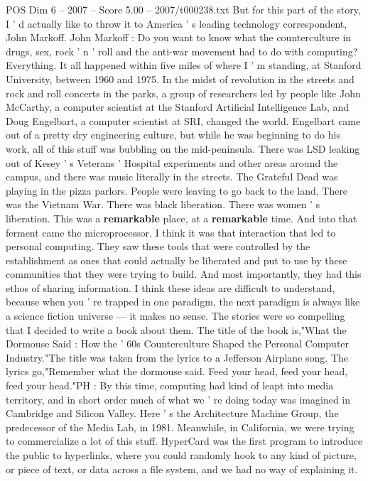 \begin{textsample}{POS Dim 6 – 2007 – Score 5.00 – 2007/t000238.txt}
But for this part of the story, I ' d actually like to throw it to America ' s leading technology correspondent, John Markoff.
John Markoff : Do you want to know what the counterculture in drugs, sex, rock ' n ' roll and the anti-war movement had to do with computing?
Everything.
It all happened within five miles of where I ' m standing, at Stanford University, between 1960 and 1975.
In the midst of revolution in the streets and rock and roll concerts in the parks, a group of researchers led by people like John McCarthy, a computer scientist at the Stanford Artificial Intelligence Lab, and Doug Engelbart, a computer scientist at SRI, changed the world.
Engelbart came out of a pretty dry engineering culture, but while he was beginning to do his work, all of this stuff was bubbling on the mid-peninsula.
There was LSD leaking out of Kesey ' s Veterans ' Hospital experiments and other areas around the campus, and there was music literally in the streets.
The Grateful Dead was playing in the pizza parlors.
People were leaving to go back to the land.
There was the Vietnam War.
There was black liberation.
There was women ' s liberation.
This was a \textbf{remarkable} place, at a \textbf{remarkable} time.
And into that ferment came the microprocessor.
I think it was that interaction that led to personal computing.
They saw these tools that were controlled by the establishment as ones that could actually be liberated and put to use by these communities that they were trying to build.
And most importantly, they had this ethos of sharing information.
I think these ideas are difficult to understand, because when you ' re trapped in one paradigm, the next paradigm is always like a science fiction universe — it makes no sense.
The stories were so compelling that I decided to write a book about them.
The title of the book is,"What the Dormouse Said : How the ' 60s Counterculture Shaped the Personal Computer Industry."The title was taken from the lyrics to a Jefferson Airplane song.
The lyrics go,"Remember what the dormouse said.
Feed your head, feed your head, feed your head."PH : By this time, computing had kind of leapt into media territory, and in short order much of what we ' re doing today was imagined in Cambridge and Silicon Valley.
Here ' s the Architecture Machine Group, the predecessor of the Media Lab, in 1981.
Meanwhile, in California, we were trying to commercialize a lot of this stuff.
HyperCard was the first program to introduce the public to hyperlinks, where you could randomly hook to any kind of picture, or piece of text, or data across a file system, and we had no way of explaining it.

\end{textsample}
